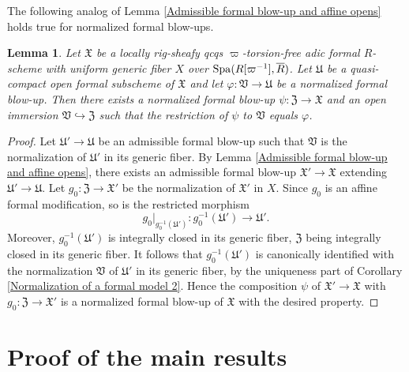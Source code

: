 \documentclass[12pt,twoside,a4paper]{article}
\newtheorem{lemma}[thm]{Lemma}
\theoremstyle{definition}
\theoremstyle{remark}
\newcommand\Spa{{\rm Spa}}
\begin{document}
The following analog of Lemma \ref{Admissible formal blow-up and affine opens} holds true for normalized formal blow-ups.
\begin{lemma}\label{Normalized formal blow-up and affine opens}Let $\mathfrak{X}$ be a locally rig-sheafy qcqs $\varpi$-torsion-free adic formal $R$-scheme with uniform generic fiber $X$ over $\Spa(R[\varpi^{-1}], \overline{R})$. Let $\mathfrak{U}$ be a quasi-compact open formal subscheme of $\mathfrak{X}$ and let $\varphi: \mathfrak{V}\to\mathfrak{U}$ be a normalized formal blow-up. Then there exists a normalized formal blow-up $\psi: \mathfrak{Z}\to \mathfrak{X}$ and an open immersion $\mathfrak{V}\hookrightarrow \mathfrak{Z}$ such that the restriction of $\psi$ to $\mathfrak{V}$ equals $\varphi$.\end{lemma}
\begin{proof}Let $\mathfrak{U}'\to\mathfrak{U}$ be an admissible formal blow-up such that $\mathfrak{V}$ is the normalization of $\mathfrak{U}'$ in its generic fiber. By Lemma \ref{Admissible formal blow-up and affine opens}, there exists an admissible formal blow-up $\mathfrak{X}'\to\mathfrak{X}$ extending $\mathfrak{U}'\to\mathfrak{U}$. Let $g_{0}: \mathfrak{Z}\to\mathfrak{X}'$ be the normalization of $\mathfrak{X}'$ in $X$. Since $g_{0}$ is an affine formal modification, so is the restricted morphism \begin{equation*}g_{0}\vert_{g_{0}^{-1}(\mathfrak{U}')}: g_{0}^{-1}(\mathfrak{U}')\to \mathfrak{U}'.\end{equation*}Moreover, $g_{0}^{-1}(\mathfrak{U}')$ is integrally closed in its generic fiber, $\mathfrak{Z}$ being integrally closed in its generic fiber. It follows that $g_{0}^{-1}(\mathfrak{U}')$ is canonically identified with the normalization $\mathfrak{V}$ of $\mathfrak{U}'$ in its generic fiber, by the uniqueness part of Corollary \ref{Normalization of a formal model 2}. Hence the composition $\psi$ of $\mathfrak{X}'\to\mathfrak{X}$ with $g_{0}: \mathfrak{Z}\to\mathfrak{X}'$ is a normalized formal blow-up of $\mathfrak{X}$ with the desired property.\end{proof}

\section{Proof of the main results}\label{sec:main results}
\end{document}
